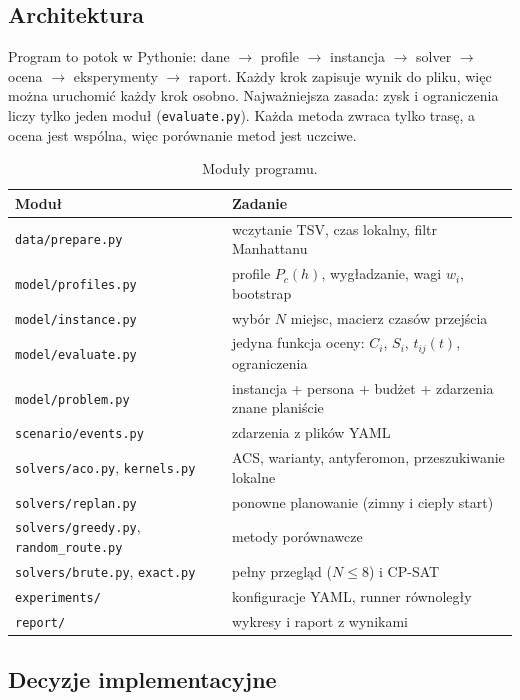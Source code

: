 \documentclass[11pt,a4paper]{article}
\begin{document}
\subsection{Architektura}

Program to potok w Pythonie: dane $\rightarrow$ profile $\rightarrow$ instancja $\rightarrow$ solver $\rightarrow$ ocena $\rightarrow$ eksperymenty $\rightarrow$ raport. Każdy krok zapisuje wynik do pliku, więc można uruchomić każdy krok osobno. Najważniejsza zasada: zysk i ograniczenia liczy tylko jeden moduł (\texttt{evaluate.py}). Każda metoda zwraca tylko trasę, a ocena jest wspólna, więc porównanie metod jest uczciwe.

\begin{table}[h]
\centering
\caption{Moduły programu.}
\begin{tabular}{ll}
\toprule
Moduł & Zadanie \\
\midrule
\texttt{data/prepare.py} & wczytanie TSV, czas lokalny, filtr Manhattanu \\
\texttt{model/profiles.py} & profile $P_c(h)$, wygładzanie, wagi $w_i$, bootstrap \\
\texttt{model/instance.py} & wybór $N$ miejsc, macierz czasów przejścia \\
\texttt{model/evaluate.py} & jedyna funkcja oceny: $C_i$, $S_i$, $t_{ij}(t)$, ograniczenia \\
\texttt{model/problem.py} & instancja + persona + budżet + zdarzenia znane planiście \\
\texttt{scenario/events.py} & zdarzenia z plików YAML \\
\texttt{solvers/aco.py}, \texttt{kernels.py} & ACS, warianty, antyferomon, przeszukiwanie lokalne \\
\texttt{solvers/replan.py} & ponowne planowanie (zimny i ciepły start) \\
\texttt{solvers/greedy.py}, \texttt{random\_route.py} & metody porównawcze \\
\texttt{solvers/brute.py}, \texttt{exact.py} & pełny przegląd ($N \leq 8$) i CP-SAT \\
\texttt{experiments/} & konfiguracje YAML, runner równoległy \\
\texttt{report/} & wykresy i raport z wynikami \\
\bottomrule
\end{tabular}
\end{table}

\subsection{Decyzje implementacyjne}
\end{document}

